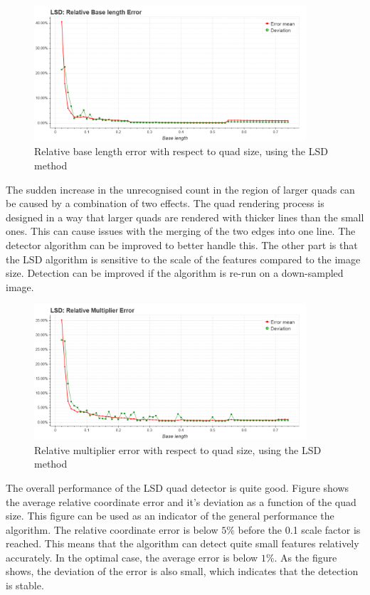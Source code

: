 \begin{figure}[ht]
	\centering
	\includegraphics[width=0.9\textwidth]{figures/plots/lsd_relative_base_length_error.png}
	\caption{Relative base length error with respect to quad size, using the LSD method}
	\label{fig:lsdRelBaseErr}
\end{figure}
The sudden increase in the unrecognised count in the region of larger quads can be caused by a combination of two effects.
The quad rendering process is designed in a way that larger quads are rendered with thicker lines than the small ones.
This can cause issues with the merging of the two edges into one line.
The detector algorithm can be improved to better handle this.
The other part is that the LSD algorithm is sensitive to the scale of the features compared to the image size.
Detection can be improved if the algorithm is re-run on a down-sampled image.

\begin{figure}[ht]
	\centering
	\includegraphics[width=0.9\textwidth]{figures/plots/lsd_relative_multiplier_error.png}
	\caption{Relative multiplier error with respect to quad size, using the LSD method}
	\label{fig:lsdRelMulErr}
\end{figure}
The overall performance of the LSD quad detector is quite good.
Figure  shows the average relative coordinate error and it's deviation as a function of the quad size.
This figure can be used as an indicator of the general performance the algorithm.
The relative coordinate error is below $5\%$ before the 0.1 scale factor is reached.
This means that the algorithm can detect quite small features relatively accurately.
In the optimal case, the average error is below $1\%$.
As the figure shows, the deviation of the error is also small, which indicates that the detection is stable.

